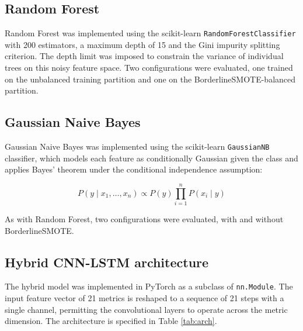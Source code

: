 \documentclass[12pt,a4paper,oneside]{report}
\begin{document}
\subsection{Random Forest}

Random Forest \cite{breiman2001} was implemented using the scikit-learn \texttt{RandomForestClassifier} with 200 estimators, a maximum depth of 15 and the Gini impurity splitting criterion. The depth limit was imposed to constrain the variance of individual trees on this noisy feature space. Two configurations were evaluated, one trained on the unbalanced training partition and one on the BorderlineSMOTE-balanced partition.

\subsection{Gaussian Naive Bayes}

Gaussian Naive Bayes was implemented using the scikit-learn \texttt{GaussianNB} classifier, which models each feature as conditionally Gaussian given the class and applies Bayes' theorem under the conditional independence assumption:

\begin{equation}
P(y \mid x_1, \ldots, x_n) \propto P(y) \prod_{i=1}^{n} P(x_i \mid y)
\label{eq:nb}
\end{equation}

As with Random Forest, two configurations were evaluated, with and without BorderlineSMOTE.

\subsection{Hybrid CNN-LSTM architecture}

The hybrid model was implemented in PyTorch as a subclass of \texttt{nn.Module}. The input feature vector of 21 metrics is reshaped to a sequence of 21 steps with a single channel, permitting the convolutional layers to operate across the metric dimension. The architecture is specified in Table \ref{tab:arch}.
\end{document}
